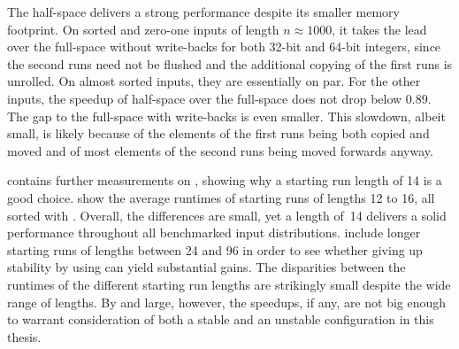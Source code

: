 The half-space \MS{} delivers a strong performance despite its smaller memory footprint.
On sorted and zero-one inputs of length \(n \approx 1000\), it takes the lead over the full-space \MS{} without write-backs for both 32-bit and 64-bit integers, since the second runs need not be flushed and the additional copying of the first runs is unrolled.
On almost sorted inputs, they are essentially on par.
For the other inputs, the speedup of half-space \MS{} over the full-space \MS{} does not drop below \num{0.89}.
The gap to the full-space \MS{} with write-backs is even smaller.
This slowdown, albeit small, is likely because of the elements of the first runs being both copied and moved and of most elements of the second runs being moved forwards anyway.

 contains further measurements on \MS{}, showing why a starting run length of 14 is a good choice.
 show the average runtimes of starting runs of lengths 12 to 16, all sorted with \IS{}.
Overall, the differences are small, yet a length of~14 delivers a solid performance throughout all benchmarked input distributions.
 include longer starting runs of lengths between 24 and 96 in order to see whether giving up stability by using \ShS{} can yield substantial gains.
The disparities between the runtimes of the different starting run lengths are strikingly small despite the wide range of lengths.
By and large, however, the speedups, if any, are not big enough to warrant consideration of both a stable and an unstable \MS{} configuration in this thesis.
